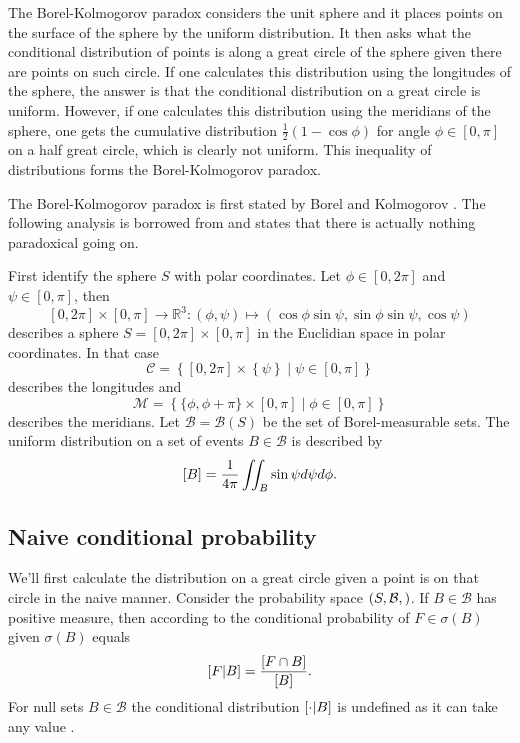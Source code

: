 \documentclass[twoside,a4paper]{article}
\theoremstyle{plain}
\theoremstyle{definition}
\theoremstyle{remark}
\numberwithin{equation}{section}
\newcommand{\R}{\mathbb{R}}
\let\P\relax
\DeclareMathOperator{\P}{\mathbb{P}}
\DeclareMathOperator{\1}{\mathbbm{1}}
\newcommand{\B}{\mathcal{B}}
\begin{document}
The Borel-Kolmogorov paradox considers the unit sphere and it places points on the surface of the sphere by the uniform distribution. It then asks what the conditional distribution of points is along a great circle of the sphere given there are points on such circle. If one calculates this distribution using the longitudes of the sphere, the answer is that the conditional distribution on a great circle is uniform. However, if one calculates this distribution using the meridians of the sphere, one gets the cumulative distribution $\frac{1}{2}\left(1-\cos\phi\right)$ for angle $\phi\in[0,\pi]$ on a half great circle, which is clearly not uniform. This inequality of distributions forms the Borel-Kolmogorov paradox.

The Borel-Kolmogorov paradox is first stated by Borel \cite{Borel09} and Kolmogorov \cite{Kolmogorov33}. The following analysis is borrowed from \cite{Gyenis17} and states that there is actually nothing paradoxical going on.

First identify the sphere $S$ with polar coordinates. Let $\phi\in[0,2\pi]$ and $\psi\in[0,\pi]$, then \[[0,2\pi]\times[0,\pi]\to\R^3:(\phi,\psi)\mapsto(\cos\phi\sin\psi,\sin\phi\sin\psi,\cos\psi)\] describes a sphere $S=[0,2\pi]\times[0,\pi]$ in the Euclidian space in polar coordinates. In that case
\[\mathcal{C}=\left\{[0,2\pi]\times\left\{\psi\right\}\mid\psi\in[0,\pi]\right\}\] describes the longitudes and \[\mathcal{M}=\left\{\{\phi,\phi+\pi\}\times[0,\pi]\mid\phi\in[0,\pi]\right\}\] describes the meridians. Let $\B=\B(S)$ be the set of Borel-measurable sets. The uniform distribution on a set of events $B\in\B$ is described by
\[\P[B]=\frac{1}{4\pi}\iint_B\sin\psi d\psi d\phi.\]


\subsection{Naive conditional probability}\label{sec:borelkol-naive}
We'll first calculate the distribution on a great circle given a point is on that circle in the naive manner. Consider the probability space $(S,\B,\P)$. If $B\in\B$ has positive measure, then according to \cite{Gyenis17} the conditional probability of $F\in\sigma(B)$ given $\sigma(B)$ equals
\[\P[F|B]=\frac{\P[F\cap B]}{\P[B]}.\] For null sets $B\in\B$ the conditional distribution $\P[\cdot|B]$ is undefined as it can take any value \cite{Gyenis17}.
\end{document}
